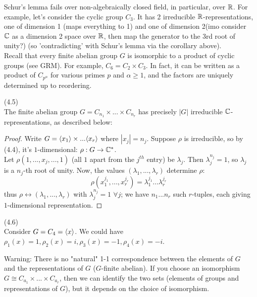\documentclass[a4paper]{article}
\begin{document}
\begin{rem}
Schur's lemma fails over non-algebraically closed field, in particular, over $\mathbb{R}$. For example, let's consider the cyclic group $C_3$. It has 2 irreducible $\mathbb{R}$-representations, one of dimension 1 (maps everything to 1) and one of dimension 2(imo consider $\mathbb{C}$ as a dimension 2 space over $\mathbb{R}$, then map the generator to the 3rd root of unity?) (so 'contradicting' with Schur's lemma via the corollary above).\\
Recall that every finite abelian group $G$ is isomorphic to a product of cyclic groups (see GRM). For example, $C_6 = C_2 \times C_3$. In fact, it can be written as a product of $C_{p^\alpha}$ for various primes $p$ and $\alpha \geq 1$, and the factors are uniquely determined up to reordering.
\end{rem}

\begin{prop} (4.5)\\
The finite abelian group $G=C_{n_1} \times ... \times C_{n_r}$ has precisely $|G|$ irreducible $\mathbb{C}$-representations, as described below:
\begin{proof}
Write $G = \langle x_1\rangle \times ... \langle x_r\rangle$ where $|x_j| = n_j$. Suppose $\rho$ is irreducible, so by (4.4), it's $1$-dimensional: $\rho:G \to \mathbb{C}^*$.\\
Let $\rho(1,...,x_j,...,1)$ (all $1$ apart from the $j^{th}$ entry) be $\lambda_j$. Then $\lambda_j^{n_j} = 1$, so $\lambda_j$ is a $n_j$-th root of unity. Now, the values $(\lambda_1,...,\lambda_r)$ determine $\rho$: $$\rho(x_1^{j_1}, ..., x_r^{j_r}) = \lambda_1^{j_1}...\lambda_r^{j_r}$$
thus $\rho \leftrightarrow (\lambda_1,...,\lambda_r)$ with $\lambda_j^{n_j} =1 $ $\forall j$; we have $n_1...n_r$ such $r$-tuples, each giving $1$-dimensional representation.
\end{proof}
\end{prop}

\begin{eg} (4.6)\\
Consider $G=C_4 = \langle x\rangle$. We could have $\rho_1(x) = 1,\rho_2(x) = i,\rho_3(x)=-1,\rho_4(x)=-i$.
\end{eg}

Warning: There is no "natural" 1-1 correspondence between the elements of $G$ and the representations of $G$ ($G$-finite abelian). If you choose an isomorphism $G \cong C_{a_1} \times ... \times C_{a_r}$, then we can identify the two sets (elements of groups and representations of $G$), but it depends on the choice of isomorphism.
\end{document}

